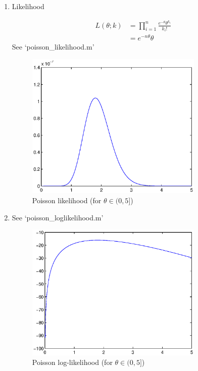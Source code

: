 \documentclass[a4paper]{article}
\begin{document}
\begin{enumerate}
	\item Likelihood

\begin{align*}
	L(\theta; k) & = \prod_{i=1}^{n} \frac{e^{-\theta}\theta^{k_{i}}}{k_{i}!} \\
	& = e^{-n\theta}\theta 
\end{align*}
\newpage
See `poisson\_likelihood.m'

	\begin{figure}[H]
		\begin{center}
			\includegraphics[width=0.80\textwidth]{poisson_likelihood.eps}
			\caption{Poisson likelihood (for $\theta \in (0,5]$)}\label{fig:poissonlh}		
		\end{center}
	\end{figure}

\item See `poisson\_loglikelihood.m'
	\begin{figure}[H]
		\begin{center}
			\includegraphics[width=0.80\textwidth]{poisson_loglikelihood.eps}
			\caption{Poisson log-likelihood (for $\theta \in (0,5]$)}\label{fig:poissonllh}		
		\end{center}
	\end{figure}


\end{enumerate}
\end{document}
